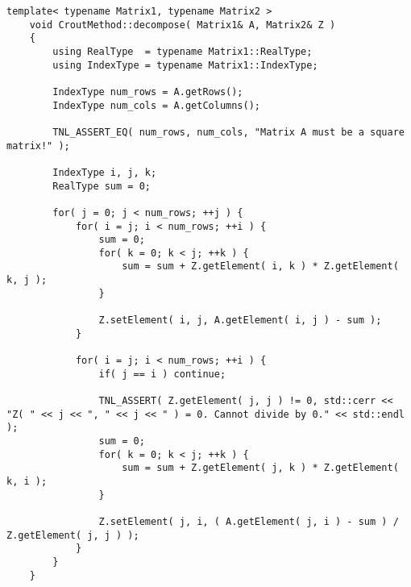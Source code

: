\begin{lstlisting}[caption={Implementation of the Crout method on the CPU using matrix $ \mathbb{Z} $. Taken from the Decomposition project repository on GitLab\protect\footref{Footnote:decomposition-project-gitlab-url}.},label={Listing:crout-method-implementation-CPU-Z}]
	template< typename Matrix1, typename Matrix2 >
	void CroutMethod::decompose( Matrix1& A, Matrix2& Z )
	{
		using RealType  = typename Matrix1::RealType;
		using IndexType = typename Matrix1::IndexType;
		
		IndexType num_rows = A.getRows();
		IndexType num_cols = A.getColumns();
		
		TNL_ASSERT_EQ( num_rows, num_cols, "Matrix A must be a square matrix!" );
		
		IndexType i, j, k;
		RealType sum = 0;
		
		for( j = 0; j < num_rows; ++j )	{
			for( i = j; i < num_rows; ++i ) {
				sum = 0;
				for( k = 0; k < j; ++k ) {
					sum = sum + Z.getElement( i, k ) * Z.getElement( k, j );
				}
				
				Z.setElement( i, j, A.getElement( i, j ) - sum );
			}
			
			for( i = j; i < num_rows; ++i ) {
				if( j == i ) continue;
				
				TNL_ASSERT( Z.getElement( j, j ) != 0, std::cerr << "Z( " << j << ", " << j << " ) = 0. Cannot divide by 0." << std::endl );
				sum = 0;
				for( k = 0; k < j; ++k ) {
					sum = sum + Z.getElement( j, k ) * Z.getElement( k, i );
				}
				
				Z.setElement( j, i, ( A.getElement( j, i ) - sum ) / Z.getElement( j, j ) );
			}
		}
	}
\end{lstlisting}




